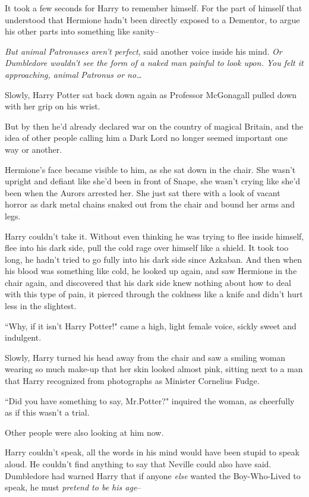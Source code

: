 It took a few seconds for Harry to remember himself. For the part of himself that understood that Hermione hadn't been directly exposed to a Dementor, to argue his other parts into something like sanity\---

\emph{But animal Patronuses aren't perfect,} said another voice inside his mind. \emph{Or Dumbledore wouldn't see the form of a naked man painful to look upon. You felt it approaching, animal Patronus or no{\ldots}}

Slowly, Harry Potter sat back down again as Professor McGonagall pulled down with her grip on his wrist.

But by then he'd already declared war on the country of magical Britain, and the idea of other people calling him a Dark Lord no longer seemed important one way or another.

Hermione's face became visible to him, as she sat down in the chair. She wasn't upright and defiant like she'd been in front of Snape, she wasn't crying like she'd been when the Aurors arrested her. She just sat there with a look of vacant horror as dark metal chains snaked out from the chair and bound her arms and legs.

Harry couldn't take it. Without even thinking he was trying to flee inside himself, flee into his dark side, pull the cold rage over himself like a shield. It took too long, he hadn't tried to go fully into his dark side since Azkaban. And then when his blood was something like cold, he looked up again, and saw Hermione in the chair again, and discovered that his dark side knew nothing about how to deal with this type of pain, it pierced through the coldness like a knife and didn't hurt less in the slightest.

``Why, if it isn't Harry Potter!" came a high, light female voice, sickly sweet and indulgent.

Slowly, Harry turned his head away from the chair and saw a smiling woman wearing so much make-up that her skin looked almost pink, sitting next to a man that Harry recognized from photographs as Minister Cornelius Fudge.

``Did you have something to say, Mr.\?Potter?" inquired the woman, as cheerfully as if this wasn't a trial.

Other people were also looking at him now.

Harry couldn't speak, all the words in his mind would have been stupid to speak aloud. He couldn't find anything to say that Neville could also have said. Dumbledore had warned Harry that if anyone \emph{else} wanted the Boy-Who-Lived to speak, he must \emph{pretend to be his age}\---


